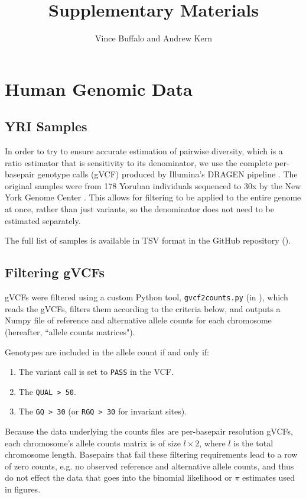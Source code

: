 \documentclass[11pt]{article}
\title{Supplementary Materials}
\author{Vince Buffalo and Andrew Kern}
\begin{document}
\maketitle

\section{Human Genomic Data}

\subsection{YRI Samples}

In order to try to ensure accurate estimation of pairwise diversity, which is a
ratio estimator that is sensitivity to its denominator, we use the complete
per-basepair genotype calls (gVCF) produced by Illumina's DRAGEN pipeline
\parencite{Illumina_Inc2020-dk}. The original samples were from 178 Yoruban
individuals sequenced to 30x by the New York Genome Center
\parencite{Byrska-Bishop2022-tn}. This allows for filtering to be applied to
the entire genome at once, rather than just variants, so the denominator does
not need to be estimated separately.

The full list of samples is available in TSV format in the GitHub repository
().

\subsection{Filtering gVCFs}

gVCFs were filtered using a custom Python tool, \texttt{gvcf2counts.py} (in
), which reads the gVCFs, filters them according to
the criteria below, and outputs a Numpy  file of reference and
alternative allele counts for each chromosome (hereafter, ``allele counts
matrices").

Genotypes are included in the allele count if and only if:

\begin{enumerate}
  \item The variant call is set to \texttt{PASS} in the VCF.
  \item The \texttt{QUAL > 50}.
  \item The \texttt{GQ > 30} (or \texttt{RGQ > 30} for invariant sites).
\end{enumerate}

Because the data underlying the counts files are per-basepair resolution gVCFs,
each chromosome's allele counts matrix is of size $l \times 2$, where $l$ is
the total chromosome length. Basepairs that fail these filtering requirements
lead to a row of zero counts, e.g. no observed reference and alternative allele
counts, and thus do not effect the data that goes into the binomial likelihood
or $\pi$ estimates used in figures.
\end{document}
